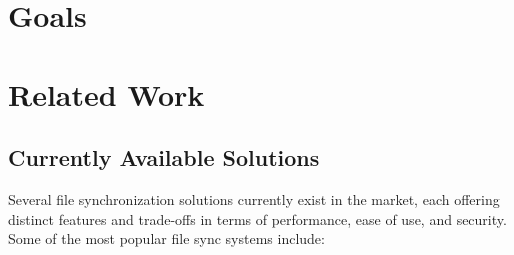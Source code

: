 \documentclass{book}
\begin{document}
    \section{Goals}
		
		\section{Related Work}
			\subsection{Currently Available Solutions}
        Several file synchronization solutions currently exist in the market, each offering distinct features and trade-offs in terms of performance, ease of use, and security. Some of the most popular file sync systems include:
\end{document}
